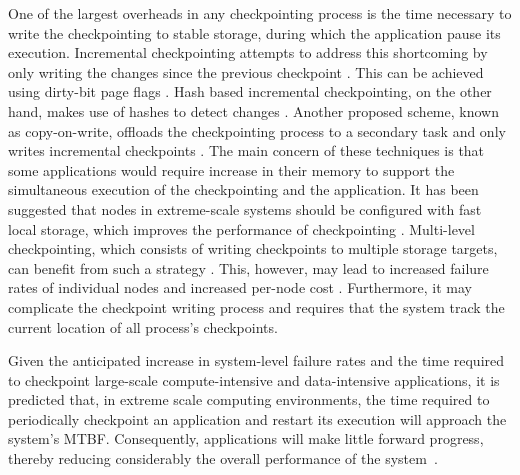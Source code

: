 One of the largest overheads in any checkpointing process is the time necessary to write the checkpointing 
to stable storage, during which the application pause its execution. Incremental checkpointing attempts
to address this shortcoming by only writing the changes since the previous checkpoint \cite{nam_ftc_1997,Agarwal:04:Adaptive}. This
can be achieved using dirty-bit page flags \cite{plank_ftcs_1994,elnozahy_1992_manetho}. Hash based incremental checkpointing, on the other
hand, makes use of hashes to detect changes \cite{nam_ftc_1997,Agarwal:04:Adaptive}. Another proposed scheme, known as copy-on-write,
offloads the checkpointing process to a secondary task and only writes incremental checkpoints \cite{li_trans_1994}.
The main concern of these techniques is that some applications would require increase in their
memory to support the simultaneous execution of the checkpointing and the application. It has been suggested that nodes in extreme-scale systems should be configured with fast local storage, which
improves the performance of checkpointing \cite{doe_ascr_exascale_2011}. Multi-level checkpointing, which consists of
writing checkpoints to multiple storage targets, can benefit from such a strategy \cite{Moody:10:SCR,hakkarine_2013}. This,
however, may lead to increased failure rates of individual nodes and increased per-node cost \cite{chen_2011_hystor}.
Furthermore, it may complicate the checkpoint writing process and requires that the system track the
current location of all process's checkpoints.


Given the anticipated increase in system-level failure rates and the time required to checkpoint large-scale compute-intensive and data-intensive applications, it is predicted that, in extreme scale computing environments, the time required to periodically checkpoint an application and restart its execution will approach the system's MTBF. Consequently, applications will make little forward progress, thereby reducing considerably the overall performance of the system~\cite{riesen_sandia_2010}.%


